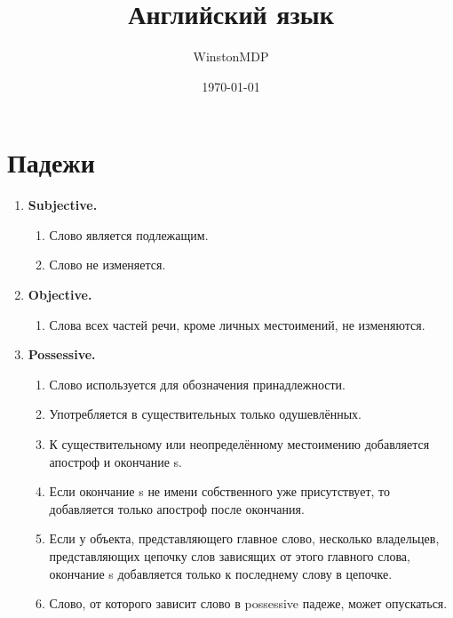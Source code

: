 \documentclass[oneside]{book}
\title{Английский язык}
\date{\today}
\author{WinstonMDP}
\begin{document}
\maketitle

\tableofcontents

\chapter{Падежи}
\begin{enumerate}
    \item \textbf{Subjective.}
    \begin{enumerate}
        \item Слово является подлежащим.
        \item Слово не изменяется.
    \end{enumerate}

    \item \textbf{Objective.}
    \begin{enumerate}
        \item Слова всех частей речи, кроме личных
        местоимений, не изменяются.
    \end{enumerate}

    \item \textbf{Possessive.}
    \begin{enumerate}
        \item Слово используется для обозначения
        принадлежности.

        \item Употребляется в существительных
        только одушевлённых.

        \item К существительному или неопределённому местоимению добавляется \\
        апостроф и окончание s.

        \item Если окончание s не имени собственного
        уже присутствует, то добавляется
        только апостроф после окончания.

        \item Если у объекта, представляющего
        главное слово, несколько владельцев,
        представляющих цепочку слов зависящих от этого главного слова,
        окончание s добавляется
        только к последнему слову в цепочке.

        \item Слово, от которого зависит
        слово в possessive падеже,
        может опускаться.
    \end{enumerate}


\end{enumerate}
\end{document}
